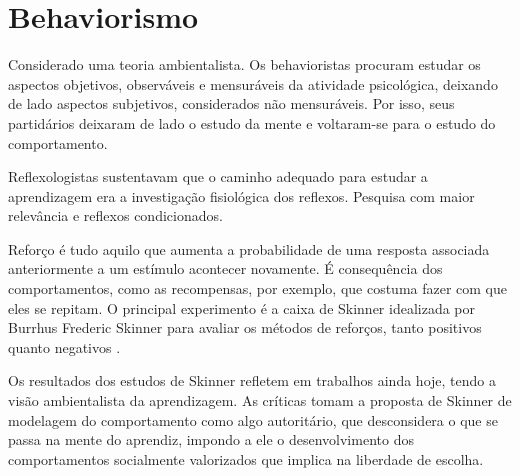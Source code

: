 \newpage
\section{Behaviorismo}\label{behaviorismo}

Considerado uma teoria ambientalista. 
Os behavioristas procuram estudar os aspectos objetivos, observáveis e mensuráveis da atividade psicológica, deixando de lado aspectos subjetivos, considerados não mensuráveis. 
Por isso, seus partidários deixaram de lado o estudo da mente e voltaram-se para o estudo do comportamento.

Reflexologistas sustentavam que o caminho adequado para estudar a aprendizagem era a investigação fisiológica dos reflexos. Pesquisa com maior relevância e reflexos condicionados.

Reforço é tudo aquilo que aumenta a probabilidade de uma resposta associada anteriormente a um estímulo acontecer novamente. É consequência dos comportamentos, como as recompensas, por exemplo, que costuma fazer com que eles se repitam.
O principal experimento é a caixa de Skinner idealizada por Burrhus Frederic Skinner para avaliar os  métodos de reforços, tanto positivos quanto negativos \cite{silva2007psicologia_educacao}.

Os resultados dos estudos de Skinner refletem em trabalhos ainda hoje, tendo a visão ambientalista da aprendizagem. 
As críticas tomam a proposta de Skinner de modelagem do comportamento como algo autoritário, que desconsidera o que se passa na mente do aprendiz, impondo a ele o desenvolvimento dos comportamentos
socialmente valorizados que implica na liberdade de escolha.
